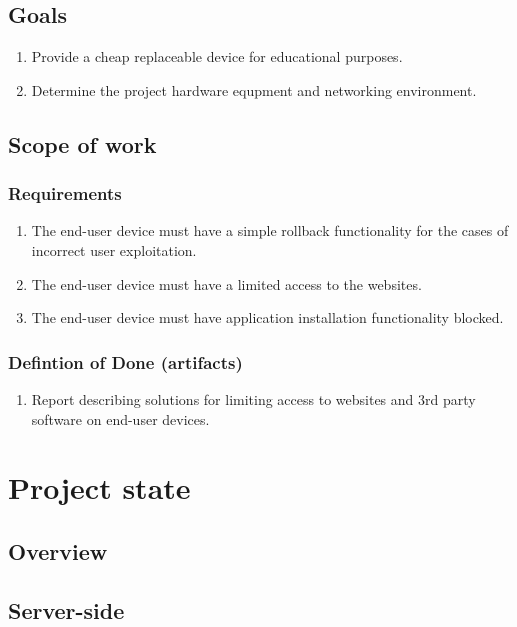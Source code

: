 \documentclass[a4paper, sans, booktabs, totpages, english]{report}
\begin{document}
\chapter{Goals}

\begin{enumerate}
\item Provide a cheap replaceable device for educational purposes.
\item Determine the project hardware equpment and networking environment.
\end{enumerate}


\chapter{Scope of work}

\section{Requirements}

\begin{enumerate}
\item The end-user device must have a simple rollback functionality for
the cases of incorrect user exploitation.
\item The end-user device must have a limited access to the websites.
\item The end-user device must have application installation
functionality blocked.
\end{enumerate}

\section{Defintion of Done (artifacts)}

\begin{enumerate}
\item Report describing solutions for limiting access to websites and
3rd party software on end-user devices.
\end{enumerate}


\part{Project state}

\chapter{Overview}

\chapter{Server-side}
\end{document}
